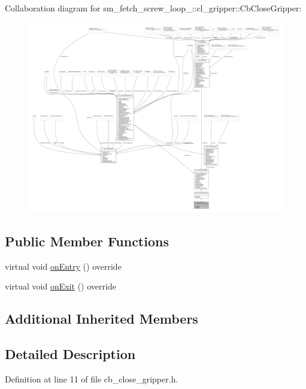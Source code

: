 Collaboration diagram for sm\+\_\+fetch\+\_\+screw\+\_\+loop\+\_\+:\+:cl\+\_\+gripper\+:\+:Cb\+Close\+Gripper\+:
\nopagebreak
\begin{figure}[H]
\begin{center}
\leavevmode
\includegraphics[width=350pt]{classsm__fetch__screw__loop__1_1_1cl__gripper_1_1CbCloseGripper__coll__graph}
\end{center}
\end{figure}
\subsection*{Public Member Functions}
\begin{DoxyCompactItemize}
\item 
virtual void \hyperlink{classsm__fetch__screw__loop__1_1_1cl__gripper_1_1CbCloseGripper_a9a0fe49dd77571008f1cf734ec946709}{on\+Entry} () override
\item 
virtual void \hyperlink{classsm__fetch__screw__loop__1_1_1cl__gripper_1_1CbCloseGripper_a12ed01508c835a79bad97bc2690b3642}{on\+Exit} () override
\end{DoxyCompactItemize}
\subsection*{Additional Inherited Members}


\subsection{Detailed Description}


Definition at line 11 of file cb\+\_\+close\+\_\+gripper.\+h.



